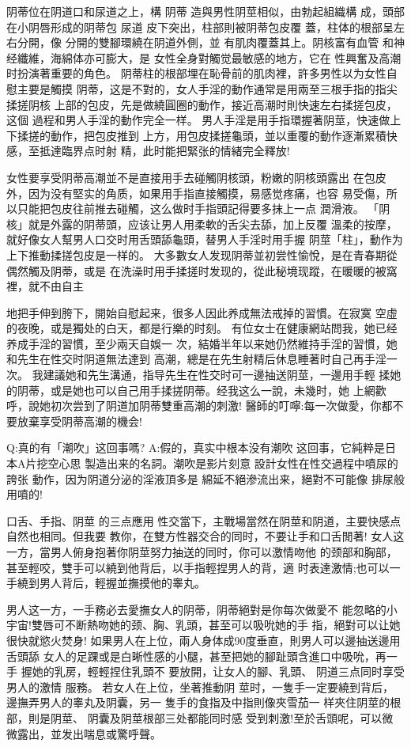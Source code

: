 \documentclass[12pt,UTF8]{ctexbook}
\begin{document}
阴蒂位在阴道口和尿道之上，構
阴蒂
造與男性阴莖相似，由勃起組織構
成，頭部在小阴唇形成的阴蒂包
尿道
皮下突出，柱部則被阴蒂包皮覆
蓋，柱体的根部呈左右分開，像
分開的雙腳環繞在阴道外側，並
有肌肉覆蓋其上。阴核富有血管
和神经纖維，海綿体亦可膨大，是
女性全身對觸觉最敏感的地方，它在
性興奮及高潮时扮演著重要的角色。
阴蒂柱的根部埋在恥骨前的肌肉裡，許多男性以为女性自慰主要是觸摸
阴蒂，这是不對的，女人手淫的動作通常是用兩至三根手指的指尖揉搓阴核
上部的包皮，先是做繞圓圈的動作，接近高潮时則快速左右揉搓包皮，这個
過程和男人手淫的動作完全一样。
男人手淫是用手指環握著阴莖，快速做上下揉搓的動作，把包皮推到
上方，用包皮揉搓龜頭，並以重覆的動作逐漸累積快感，至抵達臨界点时射
精，此时能把緊张的情緒完全釋放!

女性要享受阴蒂高潮並不是直接用手去碰觸阴核頭，粉嫩的阴核頭露出
在包皮外，因为没有堅实的角质，如果用手指直接觸摸，易感觉疼痛，也容
易受傷，所以只能把包皮往前推去碰觸，这么做时手指頭記得要多抹上一点
潤滑液。
「阴核」就是外露的阴蒂頭，应该让男人用柔軟的舌尖去舔，加上反覆
溫柔的按摩，就好像女人幫男人口交时用舌頭舔龜頭，替男人手淫时用手握
阴莖「柱」，動作为上下推動揉搓包皮是一样的。
大多數女人发现阴蒂並初尝性愉悅，是在青春期從偶然觸及阴蒂，或是
在洗澡时用手揉搓时发现的，從此秘境现蹤，在暖暖的被窩裡，就不由自主

地把手伸到胯下，開始自慰起来，很多人因此养成無法戒掉的習慣。在寂寞
空虛的夜晚，或是獨处的白天，都是行樂的时刻。
有位女士在健康網站問我，她已经养成手淫的習慣，至少兩天自娛一
次，結婚半年以来她仍然維持手淫的習慣，她和先生在性交时阴道無法達到
高潮，總是在先生射精后休息睡著时自己再手淫一次。
我建議她和先生溝通，指导先生在性交时可一邊抽送阴莖，一邊用手輕
揉她的阴蒂，或是她也可以自己用手揉搓阴蒂。经我这么一說，未幾时，她
上網歡呼，說她初次尝到了阴道加阴蒂雙重高潮的刺激!
醫師的叮嚀:每一次做愛，你都不要放棄享受阴蒂高潮的機会!

Q:真的有「潮吹」这回事嗎?
A:假的，真实中根本没有潮吹
这回事，它純粹是日本A片挖空心思
製造出来的名詞。潮吹是影片刻意
設計女性在性交過程中噴尿的誇张
動作，因为阴道分泌的淫液頂多是
綿延不絕滲流出来，絕對不可能像
排尿般用噴的!

口舌、手指、阴莖
的三点應用
性交當下，主戰場當然在阴莖和阴道，主要快感点自然也相同。但我要
教你，在雙方性器交合的同时，不要让手和口舌閒著!
女人这一方，當男人俯身抱著你阴莖努力抽送的同时，你可以激情吻他
的颈部和胸部，甚至輕咬，雙手可以繞到他背后，以手指輕捏男人的背，適
时表達激情;也可以一手繞到男人背后，輕握並撫摸他的睾丸。

男人这一方，一手務必去愛撫女人的阴蒂，阴蒂絕對是你每次做愛不
能忽略的小宇宙!雙唇可不断熱吻她的颈、胸、乳頭，甚至可以吸吮她的手
指，絕對可以让她很快就慾火焚身!
如果男人在上位，兩人身体成90度垂直，則男人可以邊抽送邊用舌頭舔
女人的足踝或是白晰性感的小腿，甚至把她的腳趾頭含進口中吸吮，再一手
握她的乳房，輕輕捏住乳頭不
要放開，让女人的腳、乳頭、
阴道三点同时享受男人的激情
服務。
若女人在上位，坐著推動阴
莖时，一隻手一定要繞到背后，
邊撫弄男人的睾丸及阴囊，另一
隻手的食指及中指則像夾雪茄一
样夾住阴莖的根部，則是阴莖、
阴囊及阴莖根部三处都能同时感
受到刺激!至於舌頭呢，可以微
微露出，並发出喘息或驚呼聲。
\end{document}
